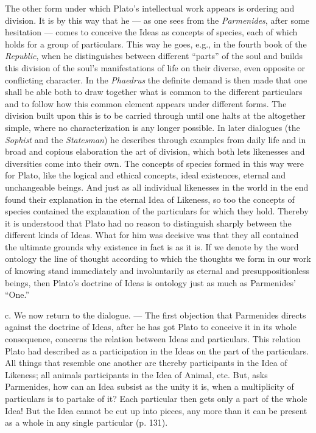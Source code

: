 \documentclass[12pt,a4paper,openany]{book}
\newcommand{\opage}[1]{\marginnote{\footnotesize\textit{[#1]}}}
\begin{document}
The other form under which Plato’s intellectual work
appears is ordering and division. It is by this way that
he --- as one sees from the \textit{Parmenides}, after some hesitation
--- comes to conceive the Ideas as concepts of species,
each of which holds for a group of particulars.
This way he goes, e.g., in the fourth book of the \textit{Republic}, when
he distinguishes between different ``parts'' of the soul and builds
this division of the soul’s manifestations of life on their diverse,
even opposite or conflicting character.
In the \textit{Phaedrus} the definite demand is then made that one
shall be able both to draw together what is common to the
different particulars and to follow how this common element
\setcounter{footnote}{0}%
\opage{14}appears under different forms. The division built upon this
is to be carried through until one halts at the
altogether simple, where no characterization is any longer possible.
In later dialogues (the \textit{Sophist} and the \textit{Statesman}) he describes
through examples from daily life and in broad and
copious elaboration the art of division, which both
lets likenesses and diversities come into their own. The
concepts of species formed in this way were for Plato,
like the logical and ethical concepts, ideal existences,
eternal and unchangeable beings. And just as all individual
likenesses in the world in the end found their explanation in
the eternal Idea of Likeness, so too the concepts of species contained
the explanation of the particulars for which they hold.
Thereby it is understood that Plato had no reason to distinguish
sharply between the different kinds of Ideas. What for
him was decisive was that they all contained the ultimate
grounds why existence in fact is as it is. If
we denote by the word ontology the line of thought according to which
the thoughts we form in our work of knowing stand immediately
and involuntarily as eternal and presuppositionless
beings, then Plato’s doctrine of Ideas is ontology just as much as
Parmenides’ ``One.''

c. We now return to the dialogue. --- The first objection
that Parmenides directs against the doctrine of Ideas, after he has
got Plato to conceive it in its whole consequence,
concerns the relation between Ideas and particulars. This relation
Plato had described as a participation in the Ideas on the
part of the particulars. All things that resemble one another are thereby
participants in the Idea of Likeness; all animals participants in the Idea of Animal,
etc. But, asks Parmenides, how can an Idea
subsist as the unity it is, when a multiplicity of
particulars is to partake of it? Each particular then gets only a
\setcounter{footnote}{0}%
\opage{15}part of the whole Idea! But the Idea cannot be cut up into pieces, any more
than it can be present as a whole in any single
particular (p. 131).
\end{document}

